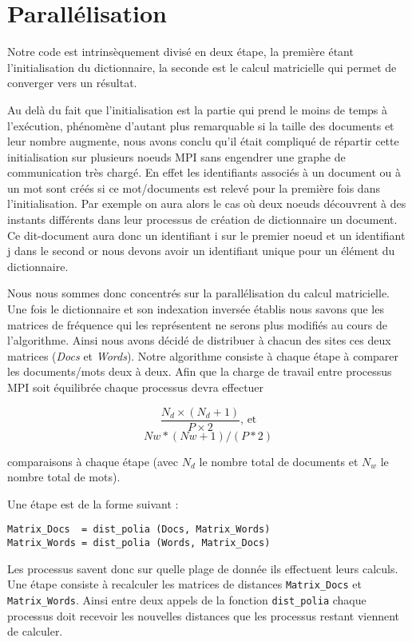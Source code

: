 \section{Parallélisation}

Notre code est intrinsèquement divisé en deux étape,
la première étant l'initialisation du dictionnaire,
la seconde est le calcul matricielle qui permet de
converger vers un résultat.

Au delà du fait que l'initialisation est la partie
qui prend le moins de temps à l'exécution,
phénomène d'autant plus remarquable si la taille des
documents et leur nombre augmente,
nous avons conclu qu'il était compliqué de répartir
cette initialisation sur plusieurs noeuds MPI sans
engendrer une graphe de communication très chargé.
En effet les identifiants associés à un document
ou à un mot sont créés si ce mot/documents est relevé
pour la première fois dans l'initialisation.
Par exemple on aura alors le cas où deux noeuds
découvrent à des instants différents dans leur processus
de création de dictionnaire un document.
Ce dit-document aura donc un identifiant i sur
le premier noeud et un identifiant j dans le second
or nous devons avoir un identifiant unique pour
un élément du dictionnaire.

Nous nous sommes donc concentrés sur la parallélisation
du calcul matricielle.
Une fois le dictionnaire et son indexation inversée
établis nous savons que les matrices de fréquence qui les
représentent ne serons plus modifiés au cours de l'algorithme.
Ainsi nous avons décidé de distribuer à chacun des sites
ces deux matrices ({\it Docs} et {\it Words}).
Notre algorithme consiste à chaque étape à comparer
les documents/mots deux à deux.
Afin que la charge de travail entre processus MPI soit
équilibrée chaque processus devra effectuer

\[ \frac{N_d \times (N_d+1)}{P \times 2}\mbox{, et} \]
\[ Nw*(Nw+1)/(P*2) \]

comparaisons à chaque étape
(avec $N_d$ le nombre total de documents
et $N_w$ le nombre total de mots).

Une étape est de la forme suivant :

\begin{verbatim}
Matrix_Docs  = dist_polia (Docs, Matrix_Words)
Matrix_Words = dist_polia (Words, Matrix_Docs)
\end{verbatim}

Les processus savent donc sur quelle plage de donnée
ils effectuent leurs calculs.
Une étape consiste à recalculer les matrices de distances
{\tt Matrix\_Docs} et {\tt Matrix\_Words}.
Ainsi entre deux appels de la fonction {\tt dist\_polia}
chaque processus doit recevoir les nouvelles distances que
les processus restant viennent de calculer.
